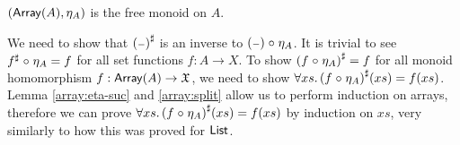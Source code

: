 \begin{propositionrep}\label{array:univ}
    $(\operatorname{\mathsf{Array}}(A),\eta_A)$ is the free monoid on $A$.
\end{propositionrep}

\begin{proofsketch}
    We need to show that ${({\scriptstyle{-}})}^{\sharp}$ is an inverse to $({\scriptstyle{-}}) \mathrel{\circ} \eta_A$.
    It is trivial to see ${f}^{\sharp} \mathrel{\circ} \eta_A = f$ for all set functions $f : A \to X$.
    To show ${(f \mathrel{\circ} \eta_A)}^{\sharp} = f$ for all monoid homomorphism $f : \operatorname{\mathsf{Array}}(A) \to \mathfrak{X}$,
    we need to show $\forall xs.\, {(f \mathrel{\circ} \eta_A)}^{\sharp}(xs) = f(xs)$.
    Lemma \cref{array:eta-suc} and \cref{array:split} allow us to perform induction on arrays,
    therefore we can prove $\forall xs.\, {(f \mathrel{\circ} \eta_A)}^{\sharp}(xs) = f(xs)$ by induction on $xs$,
    very similarly to how this was proved for $\operatorname{\mathsf{List}}$.
\end{proofsketch}

